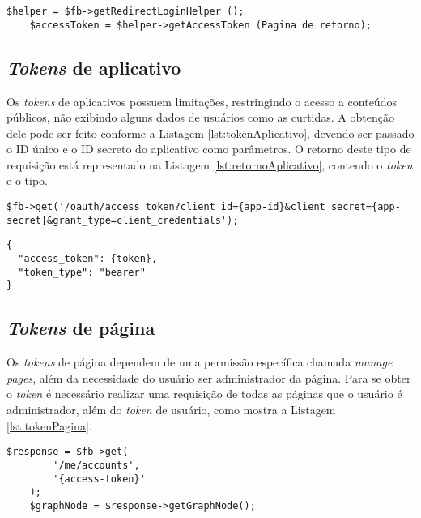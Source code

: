 \begin{lstlisting}[caption={Obtendo Token de acesso a página},label={lst:tokenUsuario}]
	$helper = $fb->getRedirectLoginHelper ();
	$accessToken = $helper->getAccessToken (Pagina de retorno);
\end{lstlisting}

\subsection{\textit{Tokens} de aplicativo}
Os \textit{tokens} de aplicativos possuem limitações, restringindo o acesso a conteúdos públicos, não exibindo alguns dados de usuários como as curtidas. A obtenção dele pode ser feito conforme a Listagem \ref{lst:tokenAplicativo}, devendo ser passado o ID único e o ID secreto do aplicativo como parâmetros. O retorno deste tipo de requisição está representado na Listagem \ref{lst:retornoAplicativo}, contendo o \textit{token} e o tipo.

\begin{lstlisting}[caption={Obtendo \textit{token} de acesso de aplicativos},label={lst:tokenAplicativo}]
    $fb->get('/oauth/access_token?client_id={app-id}&client_secret={app-secret}&grant_type=client_credentials');
\end{lstlisting}

\begin{lstlisting}[caption={Retorno \textit{token} de acesso de aplicativo \ref{lst:tokenAplicativo}},label={lst:retornoAplicativo}]
{
  "access_token": {token},
  "token_type": "bearer"
}
\end{lstlisting}

\subsection{\textit{Tokens} de página}
Os \textit{tokens} de página dependem de uma permissão específica chamada \textit{manage\underline{{ }}pages}, além da necessidade do usuário ser administrador da página. Para se obter o \textit{token} é necessário realizar uma requisição de todas as páginas que o usuário é administrador, além do \textit{token} de usuário, como mostra a Listagem \ref{lst:tokenPagina}.

\begin{lstlisting}[caption={Obtendo Token de acesso a página},label={lst:tokenPagina}]
    $response = $fb->get(
        '/me/accounts',
        '{access-token}'
    );
    $graphNode = $response->getGraphNode();
\end{lstlisting}

